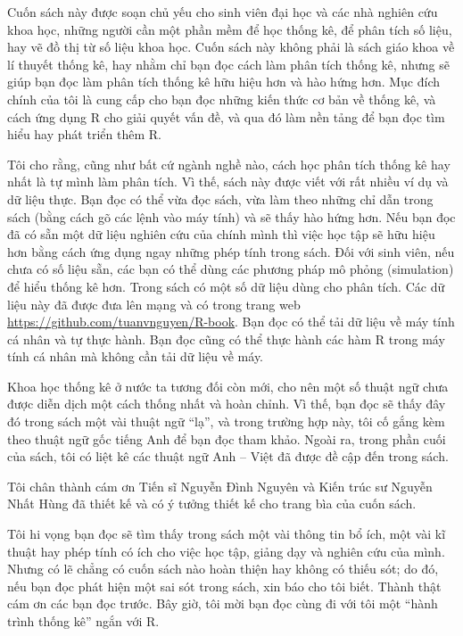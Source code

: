 \documentclass[
]{book}
\begin{document}
Cuốn sách này được soạn chủ yếu cho sinh viên đại học và các nhà nghiên cứu khoa học, những người cần một phần mềm để học thống kê, để phân tích số liệu, hay vẽ đồ thị từ số liệu khoa học. Cuốn sách này không phải là sách giáo khoa về lí thuyết thống kê, hay nhằm chỉ bạn đọc cách làm phân tích thống kê, nhưng sẽ giúp bạn đọc làm phân tích thống kê hữu hiệu hơn và hào hứng hơn. Mục đích chính của tôi là cung cấp cho bạn đọc những kiến thức cơ bản về thống kê, và cách ứng dụng R cho giải quyết vấn đề, và qua đó làm nền tảng để bạn đọc tìm hiểu hay phát triển thêm R.

Tôi cho rằng, cũng như bất cứ ngành nghề nào, cách học phân tích thống kê hay nhất là tự mình làm phân tích. Vì thế, sách này được viết với rất nhiều ví dụ và dữ liệu thực. Bạn đọc có thể vừa đọc sách, vừa làm theo những chỉ dẫn trong sách (bằng cách gõ các lệnh vào máy tính) và sẽ thấy hào hứng hơn. Nếu bạn đọc đã có sẵn một dữ liệu nghiên cứu của chính mình thì việc học tập sẽ hữu hiệu hơn bằng cách ứng dụng ngay những phép tính trong sách. Đối với sinh viên, nếu chưa có số liệu sẵn, các bạn có thể dùng các phương pháp mô phỏng (simulation) để hiểu thống kê hơn. Trong sách có một số dữ liệu dùng cho phân tích. Các dữ liệu này đã được đưa lên mạng và có trong trang web \url{https://github.com/tuanvnguyen/R-book}. Bạn đọc có thể tải dữ liệu về máy tính cá nhân và tự thực hành. Bạn đọc cũng có thể thực hành các hàm R trong máy tính cá nhân mà không cần tải dữ liệu về máy.

Khoa học thống kê ở nước ta tương đối còn mới, cho nên một số thuật ngữ chưa được diễn dịch một cách thống nhất và hoàn chỉnh. Vì thế, bạn đọc sẽ thấy đây đó trong sách một vài thuật ngữ ``lạ'', và trong trường hợp này, tôi cố gắng kèm theo thuật ngữ gốc tiếng Anh để bạn đọc tham khảo. Ngoài ra, trong phần cuối của sách, tôi có liệt kê các thuật ngữ Anh -- Việt đã được đề cập đến trong sách.

Tôi chân thành cám ơn Tiến sĩ Nguyễn Đình Nguyên và Kiến trúc sư Nguyễn Nhất Hùng đã thiết kế và có ý tưởng thiết kế cho trang bìa của cuốn sách.

Tôi hi vọng bạn đọc sẽ tìm thấy trong sách một vài thông tin bổ ích, một vài kĩ thuật hay phép tính có ích cho việc học tập, giảng dạy và nghiên cứu của mình. Nhưng có lẽ chẳng có cuốn sách nào hoàn thiện hay không có thiếu sót; do đó, nếu bạn đọc phát hiện một sai sót trong sách, xin báo cho tôi biết. Thành thật cám ơn các bạn đọc trước. Bây giờ, tôi mời bạn đọc cùng đi với tôi một ``hành trình thống kê'' ngắn với R.
\end{document}
